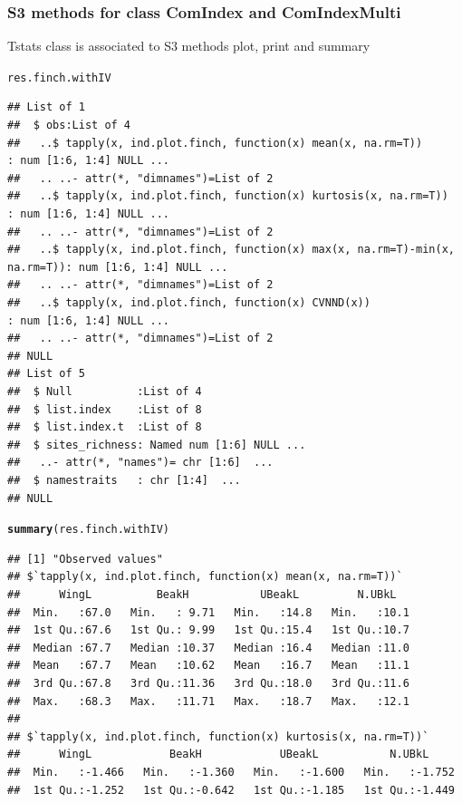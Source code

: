 \documentclass[12pt]{article}\usepackage[]{graphicx}\usepackage[]{color}
\makeatletter
\newcommand{\hlstd}[1]{\textcolor[rgb]{0.345,0.345,0.345}{#1}}%
\newcommand{\hlkwd}[1]{\textcolor[rgb]{0.737,0.353,0.396}{\textbf{#1}}}%
\newenvironment{kframe}{%
 \def\at@end@of@kframe{}%
 \ifinner\ifhmode%
  \def\at@end@of@kframe{\end{minipage}}%
  \begin{minipage}{\columnwidth}%
 \fi\fi%
 \def\FrameCommand##1{\hskip\@totalleftmargin \hskip-\fboxsep
 \colorbox{shadecolor}{##1}\hskip-\fboxsep
     \hskip-\linewidth \hskip-\@totalleftmargin \hskip\columnwidth}%
 \MakeFramed {\advance\hsize-\width
   \@totalleftmargin\z@ \linewidth\hsize
   \@setminipage}}%
 {\par\unskip\endMakeFramed%
 \at@end@of@kframe}
\newenvironment{knitrout}{}{} %
\makeatother
\begin{document}
\subsubsection{S3 methods for class ComIndex and ComIndexMulti}
Tstats class is associated to S3 methods plot, print and summary

\begin{knitrout}
\color{fgcolor}\begin{kframe}
\begin{alltt}
\hlstd{res.finch.withIV}
\end{alltt}
\begin{verbatim}
## List of 1
##  $ obs:List of 4
##   ..$ tapply(x, ind.plot.finch, function(x) mean(x, na.rm=T))               : num [1:6, 1:4] NULL ...
##   .. ..- attr(*, "dimnames")=List of 2
##   ..$ tapply(x, ind.plot.finch, function(x) kurtosis(x, na.rm=T))           : num [1:6, 1:4] NULL ...
##   .. ..- attr(*, "dimnames")=List of 2
##   ..$ tapply(x, ind.plot.finch, function(x) max(x, na.rm=T)-min(x, na.rm=T)): num [1:6, 1:4] NULL ...
##   .. ..- attr(*, "dimnames")=List of 2
##   ..$ tapply(x, ind.plot.finch, function(x) CVNND(x))                       : num [1:6, 1:4] NULL ...
##   .. ..- attr(*, "dimnames")=List of 2
## NULL
## List of 5
##  $ Null          :List of 4
##  $ list.index    :List of 8
##  $ list.index.t  :List of 8
##  $ sites_richness: Named num [1:6] NULL ...
##   ..- attr(*, "names")= chr [1:6]  ...
##  $ namestraits   : chr [1:4]  ...
## NULL
\end{verbatim}
\begin{alltt}
\hlkwd{summary}\hlstd{(res.finch.withIV)}
\end{alltt}
\begin{verbatim}
## [1] "Observed values"
## $`tapply(x, ind.plot.finch, function(x) mean(x, na.rm=T))`
##      WingL          BeakH           UBeakL         N.UBkL    
##  Min.   :67.0   Min.   : 9.71   Min.   :14.8   Min.   :10.1  
##  1st Qu.:67.6   1st Qu.: 9.99   1st Qu.:15.4   1st Qu.:10.7  
##  Median :67.7   Median :10.37   Median :16.4   Median :11.0  
##  Mean   :67.7   Mean   :10.62   Mean   :16.7   Mean   :11.1  
##  3rd Qu.:67.8   3rd Qu.:11.36   3rd Qu.:18.0   3rd Qu.:11.6  
##  Max.   :68.3   Max.   :11.71   Max.   :18.7   Max.   :12.1  
## 
## $`tapply(x, ind.plot.finch, function(x) kurtosis(x, na.rm=T))`
##      WingL            BeakH            UBeakL           N.UBkL      
##  Min.   :-1.466   Min.   :-1.360   Min.   :-1.600   Min.   :-1.752  
##  1st Qu.:-1.252   1st Qu.:-0.642   1st Qu.:-1.185   1st Qu.:-1.449  

\end{verbatim}
\end{kframe}
\end{knitrout}
\end{document}
